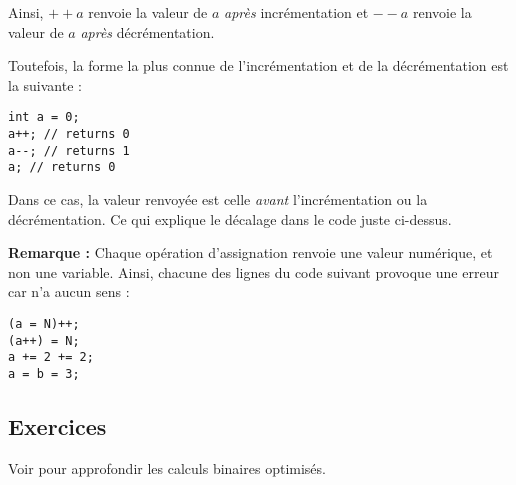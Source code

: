 \documentclass[../../../main.tex]{subfiles}
\begin{document}
Ainsi, $++a$ renvoie la valeur de $a$ \textit{après} incrémentation et $--a$ renvoie la valeur de $a$ \textit{après} décrémentation.
 
Toutefois, la forme la plus connue de l'incrémentation et de la décrémentation est la suivante :
\begin{verbatim}
int a = 0;
a++; // returns 0
a--; // returns 1
a; // returns 0
\end{verbatim}
Dans ce cas, la valeur renvoyée est celle \textit{avant} l'incrémentation ou la décrémentation. Ce qui explique le décalage dans le code juste ci-dessus.
 
\textbf{Remarque :} Chaque opération d'assignation renvoie une valeur numérique, et non une variable. Ainsi, chacune des lignes du code suivant provoque une erreur car n'a aucun sens :
\begin{verbatim}
(a = N)++;
(a++) = N;
a += 2 += 2;
a = b = 3;
\end{verbatim}
\subsection{Exercices}
Voir \cite{BitHacks} pour approfondir les calculs binaires optimisés.
\end{document}

